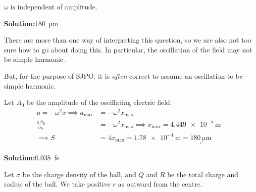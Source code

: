 \documentclass[11pt]{article}
\newcommand*\circled[1]{\tikz[baseline=(char.base)]{
		\node[shape=circle,draw,inner sep=2pt] (char) {#1};}}
\def\doubleunderline#1{\underline{\underline{#1}}}
\newcommand{\solution}[2]{\textbf{Solution:\hspace{1em}\circled{#1}}\hspace{1em}#2\hspace{1em}}
\begin{document}
\begin{enumerate}[label={[Q\arabic*]},itemsep={1em}]
		$\omega$ is independent of amplitude.
		\pagebreak[4]
		\item \solution{E}{\SI{180}{\micro\meter}}
		
			There are more than one way of interpreting this question, so we are also not too sure how to go about doing this. In particular, the oscillation of the field may not be simple harmonic. 
			
			But, for the purpose of SJPO, it is \textit{often} correct to assume an oscillation to be simple harmonic. 
			
			Let $A_0$ be the amplitude of the oscillating electric field:
			\begin{align*}
				a = -\omega^2x \implies a_{\text{max}} &= -\omega^2 x_{\text{max}} \\
				\frac{qA_0}{m_e} &= -\omega^2 x_{\text{max}} \implies x_{\text{max}} = \SI{4.449e-5}{\meter} \\
				\implies S &= 4x_\text{max} = \SI{1.78e-4}{\meter} = \doubleunderline{\SI{180}{\micro\meter}}
			\end{align*}
			
		\item \solution{A}{\SI{0.038}{\femto\second}}
		
			Let $\sigma$ be the charge density of the ball, and $Q$ and $R$ be the total charge and radius of the ball. We take positive $r$ as outward from the centre. 
			

\end{enumerate}
\end{document}
